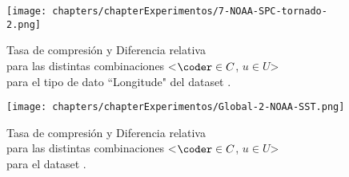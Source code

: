 
\begin{figure}
\hspace{-35pt}
\texttt{[image: chapters/chapterExperimentos/7-NOAA-SPC-tornado-2.png]}
\hspace{+10pt}
\caption{Tasa de compresión y Diferencia relativa\\para las distintas combinaciones <$\coder \in C$, $u \in U$>\\para el tipo de dato ``Longitude" del dataset \datasettornado.}
\label{fig:diff-tornado}
\end{figure}

\begin{figure}
\hspace{-35pt}
\texttt{[image: chapters/chapterExperimentos/Global-2-NOAA-SST.png]}
\hspace{+10pt}
\caption{Tasa de compresión y Diferencia relativa\\para las distintas combinaciones <$\coder \in C$, $u \in U$>\\para el dataset \datasetsst.}
\label{fig:diff-sst}
\end{figure}
